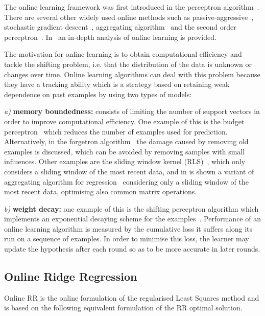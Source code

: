 The online learning framework was first introduced in the perceptron algorithm~\cite{rosenblatt58}. There are several other widely used online methods such as passive-aggressive~\cite{crammerETall2006}, stochastic gradient descent~\cite{zhang2004}, aggregating algorithm~\cite{vovk2001} and the second order perceptron~\cite{cesa-bianchi2005}.  In~\cite{cesa-bianchi2006} an in-depth analysis of online learning is provided.

The motivation for online learning is to obtain computational efficiency and tackle the shifting problem, i.e. that the distribution of the data is unknown or changes over time. Online learning algorithms can deal with this problem because they have a tracking ability which is a strategy based on retaining weak dependence on past examples by using two types of models: 

\textit{a)} \textbf{memory boundedness:} consists of limiting the number of support vectors in order to improve computational efficiency. One example of this is the budget perceptron~\cite{crammeretal2004} which reduces the number of examples used for prediction. Alternatively, in the forgetron algorithm~\cite{dekeletal2008} the damage caused by removing old examples is discussed, which can be avoided by removing samples with small influences. Other examples are the sliding window kernel (RLS)~\cite{vanvaerenberghetal2006}, which only considers a sliding window of the most recent data, and in \cite{arce+salinas2012} is shown a variant of aggregating algorithm for regression~\cite{vovk2001} considering only a sliding window of the most recent data, optimising also common matrix operations.

\textit{b)} \textbf{weight decay:} one example of this is the shifting perceptron algorithm which implements an exponential decaying scheme for the examples~\cite{cavallantietal2007}.
Performance of an online learning algorithm is measured by the cumulative loss it suffers along its run on a sequence of examples. In order to minimise this loss, the learner may update the hypothesis after each round so as to be more accurate in later rounds.


\subsection{Online Ridge Regression}

Online RR is the online formulation of the regularised Least Squares method
and is based on the following equivalent formulation of the RR optimal solution.

